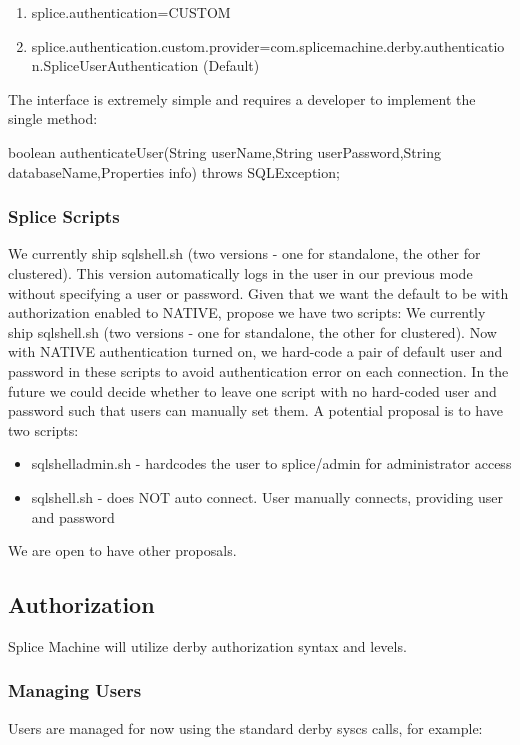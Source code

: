\documentclass{article}
\begin{document}
\begin{enumerate}
	\item splice.authentication=CUSTOM
	\item	splice.authentication.custom.provider=com.splicemachine.derby.authentication.SpliceUserAuthentication (Default)
\end{enumerate}

The interface is extremely simple and requires a developer to implement the
single method:

boolean	authenticateUser(String userName,String userPassword,String
databaseName,Properties info) throws SQLException;

\subsubsection{Splice Scripts}

We currently ship sqlshell.sh (two versions - one for standalone, the other for clustered).  This version automatically 
logs in the user in our previous mode without specifying a user or password.  Given that we want the default to be with
authorization enabled to NATIVE, propose we have two scripts:
We currently ship sqlshell.sh (two versions - one for standalone, the other for clustered). Now with NATIVE authentication 
turned on, we hard-code a pair of default user and password in these scripts to avoid authentication error on each connection.
In the future we could decide whether to leave one script with no hard-coded user and password such that users can manually 
set them. A potential proposal is to have two scripts:  

\begin{itemize}
\item sqlshelladmin.sh - hardcodes the user to splice/admin for administrator access
\item sqlshell.sh - does NOT auto connect.  User manually connects, providing user and password
\end{itemize}

We are open to have other proposals. 

\subsection{Authorization}
Splice Machine will utilize derby authorization syntax and levels. 

\subsubsection{Managing Users}
Users are managed for now using the standard derby syscs calls, for example:
\end{document}
